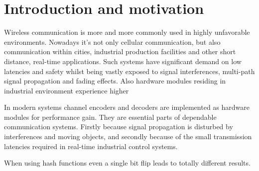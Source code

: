 \chapter{Introduction and motivation} \label{ch:int}

Wireless communication is more and more commonly used in highly unfavorable environments. Nowadays it's not only cellular communication, but also communication within cities, industrial production facilities and other short distance, real-time applications. Such systems have significant demand on low latencies and safety whilst being vastly exposed to signal interferences, multi-path signal propagation and fading effects. Also hardware modules residing in industrial environment experience higher 

In modern systems channel encoders and decoders are implemented as hardware modules for performance gain. They are essential parts of dependable communication systems. Firstly because signal propagation is disturbed by interferences and moving objects, and secondly because of the small transmission latencies required in real-time industrial control systems.

When using hash functions even a single bit flip leads to totally different results.
